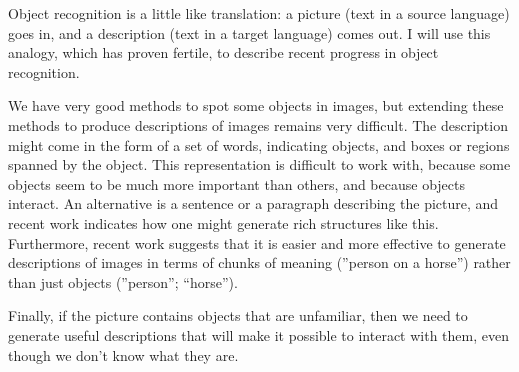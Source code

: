 Object recognition is a little like translation: a picture (text in a source language) goes in, and a description (text in a target language) comes out. I
 will use this analogy, which has proven fertile, to describe recent progress in
 object recognition.
 
 We have very good methods to spot some objects in images, but extending these
 methods to produce descriptions of images remains very difficult. The
 description might come in the form of a set of words, indicating objects, and
 boxes or regions spanned by the object. This representation is difficult to
 work with, because some objects seem to be much more important than others, and
 because objects interact. An alternative is a sentence or a paragraph
 describing the picture, and recent work indicates how one might generate rich
 structures like this. Furthermore, recent work suggests that it is easier and
 more effective to generate descriptions of images in terms of chunks of meaning
 (''person on a horse'') rather than just objects (''person''; ``horse'').
 
 Finally, if the picture contains objects that are unfamiliar, then we need to
 generate useful descriptions that will make it possible to interact with them,
 even though we don't know what they are.

